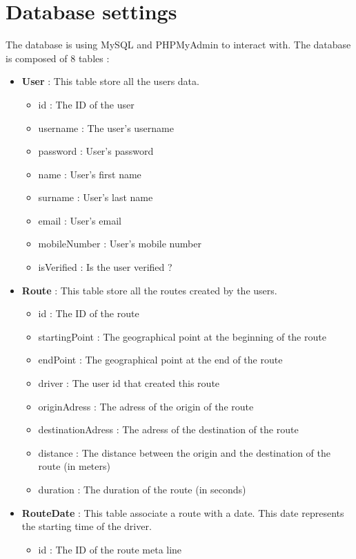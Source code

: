 \section{Database settings}
The database is using MySQL and PHPMyAdmin to interact with. The database is composed of 8 tables :
\begin{itemize}
    \item \textbf{User} : This table store all the users data.
    \begin{itemize}
    	\item id : The ID of the user
    	\item username : The user's username
    	\item password : User's password
    	\item name : User's first name
    	\item surname : User's last name
    	\item email	: User's email
    	\item mobileNumber : User's mobile number
    	\item isVerified : Is the user verified ?
    \end{itemize}
    \item \textbf{Route} : This table store all the routes created by the users.
    \begin{itemize}
    	\item id : The ID of the route
    	\item startingPoint : The geographical point at the beginning of the route
    	\item endPoint : The geographical point at the end of the route
    	\item driver : The user id that created this route
    	\item originAdress : The adress of the origin of the route
    	\item destinationAdress	: The adress of the destination of the route
    	\item distance : The distance between the origin and the destination of the route (in meters)
    	\item duration : The duration of the route (in seconds)
    \end{itemize}
    \item \textbf{RouteDate} : This table associate a route with a date. This date represents the starting time of the driver.
    \begin{itemize}
    	\item id : The ID of the route meta line

\end{itemize}
\end{itemize}
